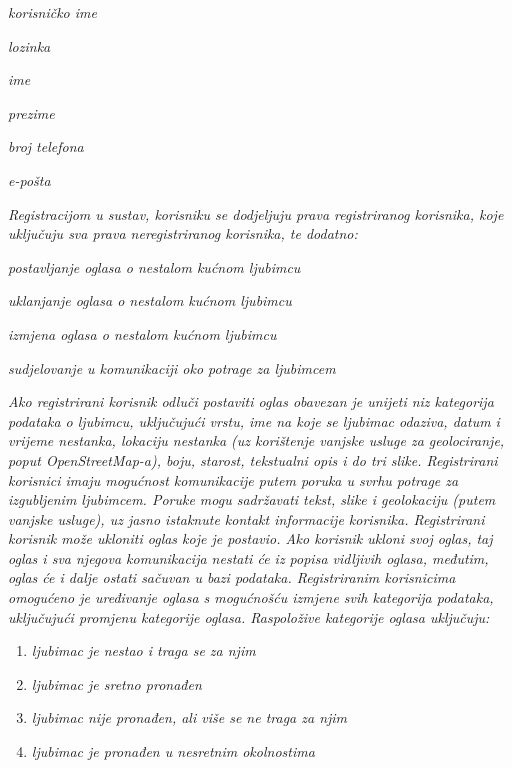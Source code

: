 		\begin{packed_item}
			\item \textit{korisničko ime}
			\item \textit{lozinka}
			\item \textit{ime}
			\item \textit{prezime}
			\item \textit{broj telefona}
			\item \textit{e-pošta}
		\end{packed_item}
		
		\textit{Registracijom u sustav, korisniku se dodjeljuju prava registriranog korisnika, koje uključuju sva prava neregistriranog korisnika, te dodatno:}
		
		\begin{packed_item}
			\item \textit{postavljanje oglasa o nestalom kućnom ljubimcu}
			\item \textit{uklanjanje oglasa o nestalom kućnom ljubimcu}
			\item \textit{izmjena oglasa o nestalom kućnom ljubimcu}
			\item \textit{sudjelovanje u komunikaciji oko potrage za ljubimcem}
		\end{packed_item}
		
		\textit{Ako registrirani korisnik odluči postaviti oglas obavezan je unijeti niz kategorija podataka o ljubimcu, uključujući vrstu, ime na koje se ljubimac odaziva, datum i vrijeme nestanka, lokaciju nestanka (uz korištenje vanjske usluge za geolociranje, poput OpenStreetMap-a), boju, starost, tekstualni opis i do tri slike. Registrirani korisnici imaju mogućnost komunikacije putem poruka u svrhu potrage za izgubljenim ljubimcem. Poruke mogu sadržavati tekst, slike i geolokaciju (putem vanjske usluge), uz jasno istaknute kontakt informacije korisnika. Registrirani korisnik može ukloniti oglas koje je postavio. Ako korisnik ukloni svoj oglas, taj oglas i sva njegova komunikacija nestati će iz popisa vidljivih oglasa, međutim, oglas će i dalje ostati sačuvan u bazi podataka. Registriranim korisnicima omogućeno je uređivanje oglasa s mogućnošću izmjene svih kategorija podataka, uključujući promjenu kategorije oglasa. Raspoložive kategorije oglasa uključuju:}
		
		\begin{enumerate}
			\item \textit{ljubimac je nestao i traga se za njim}
			\item \textit{ljubimac je sretno pronađen}
			\item \textit{ljubimac nije pronađen, ali više se ne traga za njim}
			\item \textit{ljubimac je pronađen u nesretnim okolnostima}
		\end{enumerate}
		
